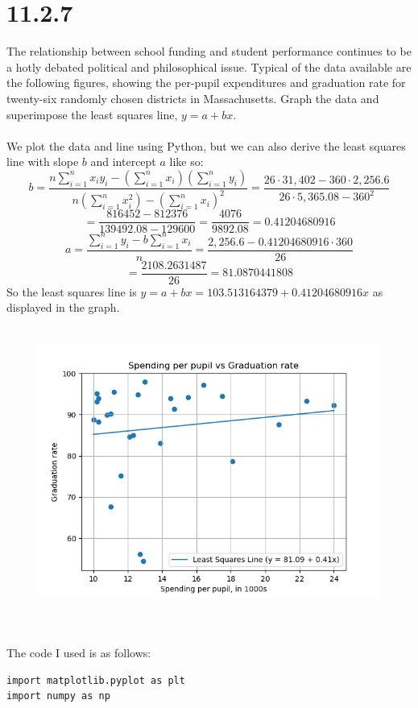 \documentclass{article}
\begin{document}
{\section*{11.2.7}
The relationship between school funding and student performance continues to be a hotly debated political and philosophical issue. Typical of the data available are the following figures, showing the per-pupil expenditures and graduation rate for twenty-six randomly chosen districts in Massachusetts. Graph the data and superimpose the least squares line, \(y = a + bx\).
\\
\\
We plot the data and line using Python, but we can also derive the least squares line with slope \(b\) and intercept \(a\) like so:
\[
b = \frac{n\sum_{i=1}^n x_i y_i - (\sum_{i=1}^n x_i) (\sum_{i=1}^{n} y_i)}{n(\sum_{i=1}^n x_i^2) - (\sum_{i=1}^{n} x_i)^2} = \frac{26 \cdot 31,402  - 360 \cdot 2,256.6}{26 \cdot 5,365.08 - 360^2}
\]
\[
= \frac{816452 - 812376}{139492.08 - 129600} = \frac{4076}{9892.08} = 0.41204680916
\]
\[
a = \frac{\sum_{i=1}^{n} y_i - b \sum_{i=1}^{n}x_i}{n} = \frac{2,256.6 - 0.41204680916 \cdot 360}{26}
\]
\[
= \frac{2108.2631487}{26} = 81.0870441808
\]
So the least squares line is \(y = a + bx = 103.513164379 + 0.41204680916x\) as displayed in the graph.
\\
\\
\begin{figure}[h!]
  \centering
  \includegraphics[width=500pt]{school_1127.png}
\end{figure}
\\
\\
The code I used is as follows:
\begin{verbatim}
import matplotlib.pyplot as plt
import numpy as np


\end{verbatim}}
\end{document}

